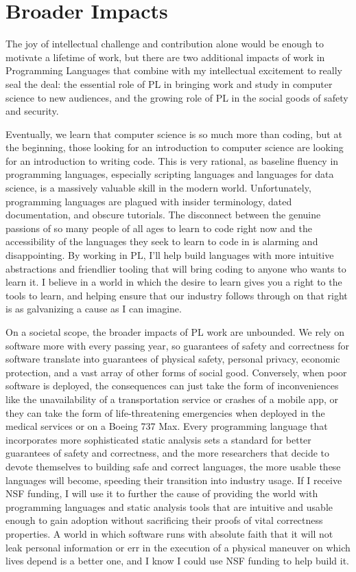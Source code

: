 \documentclass{nsf-grfp}
\begin{document}
\section*{Broader Impacts}

The joy of intellectual challenge and contribution alone would be enough to motivate a lifetime of work, but there are two additional impacts of work in Programming Languages that combine with my intellectual excitement to really seal the deal: the essential role of PL in bringing work and study in computer science to new audiences, and the growing role of PL in the social goods of safety and security.

Eventually, we learn that computer science is so much more than coding, but at the beginning, those looking for an introduction to computer science are looking for an introduction to writing code. This is very rational, as baseline fluency in programming languages, especially scripting languages and languages for data science, is a massively valuable skill in the modern world. Unfortunately, programming languages are plagued with insider terminology, dated documentation, and obscure tutorials. The disconnect between the genuine passions of so many people of all ages to learn to code right now and the accessibility of the languages they seek to learn to code in is alarming and disappointing. By working in PL, I'll help build languages with more intuitive abstractions and friendlier tooling that will bring coding to anyone who wants to learn it. I believe in a world in which the desire to learn gives you a right to the tools to learn, and helping ensure that our industry follows through on that right is as galvanizing a cause as I can imagine.

On a societal scope, the broader impacts of PL work are unbounded. We rely on software more with every passing year, so guarantees of safety and correctness for software translate into guarantees of physical safety, personal privacy, economic protection, and a vast array of other forms of social good. Conversely, when poor software is deployed, the consequences can just take the form of inconveniences like the unavailability of a transportation service or crashes of a mobile app, or they can take the form of life-threatening emergencies when deployed in the medical services or on a Boeing 737 Max. Every programming language that incorporates more sophisticated static analysis sets a standard for better guarantees of safety and correctness, and the more researchers that decide to devote themselves to building safe and correct languages, the more usable these languages will become, speeding their transition into industry usage. If I receive NSF funding, I will use it to further the cause of providing the world with programming languages and static analysis tools that are intuitive and usable enough to gain adoption without sacrificing their proofs of vital correctness properties. A world in which software runs with absolute faith that it will not leak personal information or err in the execution of a physical maneuver on which lives depend is a better one, and I know I could use NSF funding to help build it. 
\end{document}
